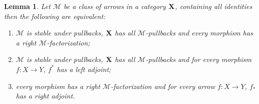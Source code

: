 \documentclass[a4paper]{article}
\def\X{\textbf {\textup{X}}}
\newtheorem{lemma}[theorem]{Lemma}
\theoremstyle{definition}
\begin{document}
\begin{lemma}\label{lem:rfact}
	Let $\mathcal{M}$ be a class of arrows  in a category $\X$, containing all identities then the following are equivalent:
	\begin{enumerate}
		\item $\mathcal{M}$ is stable under pullbacks, $\X$ has all $\mathcal{M}$-pullbacks and every morphism has a right $\mathcal{M}$-factorization;
		\item $\mathcal{M}$ is stable under pullbacks, $\X$ has all $\mathcal{M}$-pullbacks and for every morphism $f\colon X\to Y$, $f^*$ has a left adjoint;
		\item every morphism has a right $\mathcal{M}$-factorization and for every arrow $f\colon X\to Y$, $f_*$ has a right adjoint.
	\end{enumerate}
\end{lemma}
\end{document}
